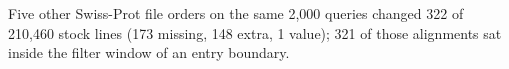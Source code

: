 \documentclass[letterpaper,twocolumn,10pt]{article}
\theoremstyle{definition}
\begin{document}
Five other Swiss\nobreakdash-Prot file orders on the same 2{,}000 queries changed 322 of 210{,}460 stock lines (173 missing, 148 extra, 1 value); 321 of those alignments sat inside the filter window of an entry boundary.
\end{document}
